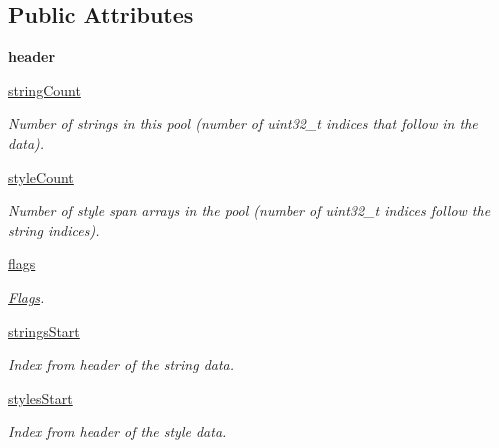 \subsection*{Public Attributes}
\begin{DoxyCompactItemize}
\item 
\mbox{\label{classarsc_1_1stringpool_1_1ResStringPool__header_acb0d963abe3f9e7688db258b7b16f637}} 
{\bfseries header}
\item 
\mbox{\hyperlink{classarsc_1_1stringpool_1_1ResStringPool__header_a6710c34ad94738147f7c99a536973926}{string\+Count}}
\begin{DoxyCompactList}\small\item\em Number of strings in this pool (number of uint32\+\_\+t indices that follow in the data). \end{DoxyCompactList}\item 
\mbox{\hyperlink{classarsc_1_1stringpool_1_1ResStringPool__header_af4fabc8ca2933e058c76ba80f75f90b8}{style\+Count}}
\begin{DoxyCompactList}\small\item\em Number of style span arrays in the pool (number of uint32\+\_\+t indices follow the string indices). \end{DoxyCompactList}\item 
\mbox{\hyperlink{classarsc_1_1stringpool_1_1ResStringPool__header_a66f1d4497df05a8d7e41c51c0a6e4bed}{flags}}
\begin{DoxyCompactList}\small\item\em \mbox{\hyperlink{classarsc_1_1stringpool_1_1ResStringPool__header_1_1Flags}{Flags}}. \end{DoxyCompactList}\item 
\mbox{\hyperlink{classarsc_1_1stringpool_1_1ResStringPool__header_ac34d0256d2b019be65b6eba225642af8}{strings\+Start}}
\begin{DoxyCompactList}\small\item\em Index from header of the string data. \end{DoxyCompactList}\item 
\mbox{\hyperlink{classarsc_1_1stringpool_1_1ResStringPool__header_a6b4e18bf84dea343ef091b7b7b6eda5a}{styles\+Start}}
\begin{DoxyCompactList}\small\item\em Index from header of the style data. \end{DoxyCompactList}\end{DoxyCompactItemize}
